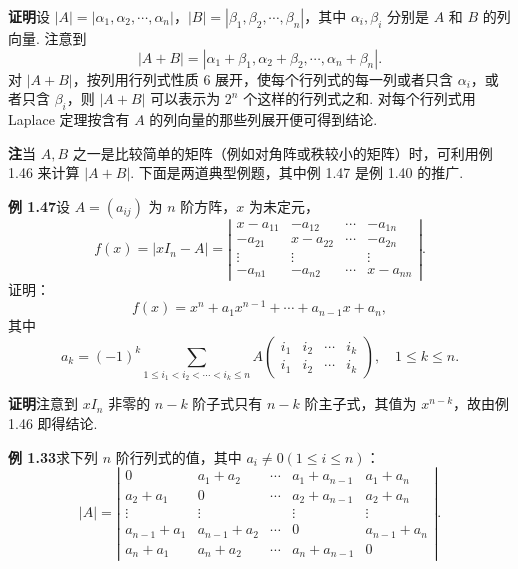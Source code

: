 \documentclass[UTF8,12pt,a4paper,fontset=fandol]{ctexart}
\begin{document}
\noindent\textbf{证明}\quad 设 $|A|=|\alpha_1,\alpha_2,\cdots,\alpha_n|$，$|B|=|\beta_1,\beta_2,\cdots,\beta_n|$，其中 $\alpha_i,\beta_i$ 分别是 $A$ 和 $B$ 的列向量. 注意到
\[
|A+B|=|\alpha_1+\beta_1,\alpha_2+\beta_2,\cdots,\alpha_n+\beta_n|.
\]
对 $|A+B|$，按列用行列式性质 6 展开，使每个行列式的每一列或者只含 $\alpha_i$，或者只含 $\beta_i$，则 $|A+B|$ 可以表示为 $2^n$ 个这样的行列式之和. 对每个行列式用 Laplace 定理按含有 $A$ 的列向量的那些列展开便可得到结论.

\noindent\textbf{注}\quad 当 $A,B$ 之一是比较简单的矩阵（例如对角阵或秩较小的矩阵）时，可利用例 1.46 来计算 $|A+B|$. 下面是两道典型例题，其中例 1.47 是例 1.40 的推广.

\noindent\textbf{例 1.47}\quad 设 $A=(a_{ij})$ 为 $n$ 阶方阵，$x$ 为未定元，
\[
f(x)=|xI_n-A|
=\left|\begin{array}{cccc}
x-a_{11} & -a_{12} & \cdots & -a_{1n}\\
-a_{21} & x-a_{22} & \cdots & -a_{2n}\\
\vdots & \vdots &        & \vdots\\
-a_{n1} & -a_{n2} & \cdots & x-a_{nn}
\end{array}\right|.
\]
证明：
\[
f(x)=x^n+a_1x^{n-1}+\cdots+a_{n-1}x+a_n,
\]
其中
\[
a_k=(-1)^k\sum_{1\le i_1<i_2<\cdots<i_k\le n}
A\begin{pmatrix}i_1&i_2&\cdots&i_k\\ i_1&i_2&\cdots&i_k\end{pmatrix},\quad 1\le k\le n.
\]

\noindent\textbf{证明}\quad 注意到 $xI_n$ 非零的 $n-k$ 阶子式只有 $n-k$ 阶主子式，其值为 $x^{n-k}$，故由例 1.46 即得结论.

\noindent\textbf{例 1.33}\quad 求下列 $n$ 阶行列式的值，其中 $a_i\ne0(1\le i\le n)$：
\[
|A|=\left|\begin{array}{ccccc}
0 & a_1+a_2 & \cdots & a_1+a_{n-1} & a_1+a_n\\
a_2+a_1 & 0 & \cdots & a_2+a_{n-1} & a_2+a_n\\
\vdots & \vdots &        & \vdots & \vdots\\
a_{n-1}+a_1 & a_{n-1}+a_2 & \cdots & 0 & a_{n-1}+a_n\\
a_n+a_1 & a_n+a_2 & \cdots & a_n+a_{n-1} & 0
\end{array}\right|.
\]
\end{document}
